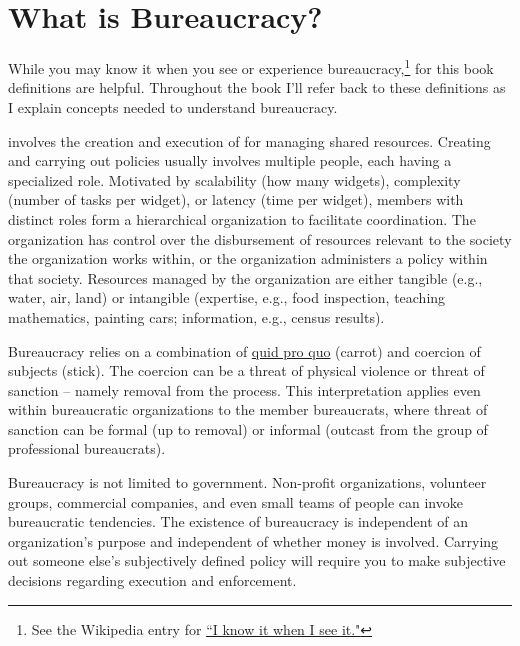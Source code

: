 \section{What is Bureaucracy?\label{sec:define-bureaucracy}}

While you may know it when you see or experience bureaucracy,\footnote{See the Wikipedia entry for \href{https://en.wikipedia.org/wiki/I_know_it_when_I_see_it}{``I know it when I see it."}} 
for this book definitions are helpful. Throughout the book I'll refer back to these definitions as I explain concepts needed to understand bureaucracy.

\iftoggle{glossaryinmargin}{\marginpar{[Glossary]}}{}
\iftoggle{glossarysubstitutionworks}{\Gls{bureaucracy}}{Bureaucracy}
involves the creation and execution of 
\iftoggle{glossarysubstitutionworks}{\glspl{policy}}{policies} for managing shared resources. 
Creating and carrying out policies usually involves multiple people, each having a specialized role. Motivated by scalability (how many widgets), complexity (number of tasks per widget), or latency (time per widget), members with distinct roles form a hierarchical organization to facilitate coordination. The organization has control over the disbursement of resources relevant to the society the organization works within, or the organization administers a policy within that society. Resources managed by the organization are either tangible (e.g., water, air, land) or intangible (expertise, e.g., food inspection, teaching mathematics, painting cars; information, e.g., census results).  

Bureaucracy relies on a combination of \href{https://en.wikipedia.org/wiki/Quid_pro_quo}{quid pro quo}
(carrot) and coercion of subjects (stick). The coercion can be a threat of physical violence or threat of sanction -- namely removal from the process. This interpretation applies even within bureaucratic organizations to the member bureaucrats, where threat of sanction can be formal (up to removal) or informal (outcast from the group of professional bureaucrats).

Bureaucracy is not limited to government. Non-profit organizations, volunteer groups, commercial companies, and even small teams of people can invoke bureaucratic tendencies. The existence of bureaucracy is independent of an organization's purpose and independent of whether money is involved. Carrying out someone else's subjectively defined policy will require you to make subjective decisions regarding execution and enforcement. 

